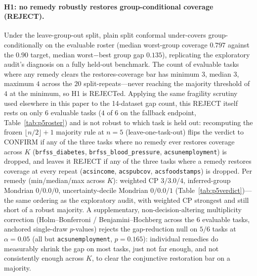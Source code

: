 \documentclass[11pt]{article}
\begin{document}
\paragraph{H1: no remedy robustly restores group-conditional coverage (REJECT).} Under the leave-group-out
split, plain split conformal under-covers group-conditionally on the evaluable roster (median worst-group
coverage $0.797$ against the $0.90$ target, median worst$-$best group gap $0.135$), replicating the
exploratory audit's diagnosis on a fully held-out benchmark. The count of evaluable tasks where any remedy
clears the restores-coverage bar has minimum $3$, median $3$, maximum $4$ across the $20$ split-repeats---never
reaching the majority threshold of $4$ at the minimum, so H1 is REJECTed. Applying the same
fragility scrutiny used elsewhere in this paper to the 14-dataset gap count, this REJECT itself rests
on only $6$ evaluable tasks ($4$ of $6$ on the fallback endpoint, Table~\ref{tab:p5roster}) and is not
robust to which task is held out: recomputing the frozen $\lfloor n/2\rfloor{+}1$ majority rule at
$n{=}5$ (leave-one-task-out) flips the verdict to CONFIRM if any of the three tasks where no remedy
ever restores coverage across $K$ (\texttt{brfss\_diabetes}, \texttt{brfss\_blood\_pressure},
\texttt{acsunemployment}) is dropped, and leaves it REJECT if any of the three tasks where a remedy
restores coverage at every repeat (\texttt{acsincome}, \texttt{acspubcov}, \texttt{acsfoodstamps}) is
dropped. Per remedy (min/median/max
across $K$): weighted CP $3/3.0/4$, inferred-group Mondrian $0/0.0/0$, uncertainty-decile Mondrian $0/0.0/1$
(Table~\ref{tab:p5verdict})---the same ordering as the exploratory audit, with weighted CP strongest and
still short of a robust majority. A supplementary, non-decision-altering multiplicity correction
(Holm--Bonferroni / Benjamini--Hochberg across the $6$ evaluable tasks, anchored single-draw $p$-values)
rejects the gap-reduction null on $5/6$ tasks at $\alpha=0.05$ (all but \texttt{acsunemployment}, $p=0.165$):
individual remedies do measurably shrink the gap on most tasks, just not far enough, and not consistently
enough across $K$, to clear the conjunctive restoration bar on a majority.
\end{document}
